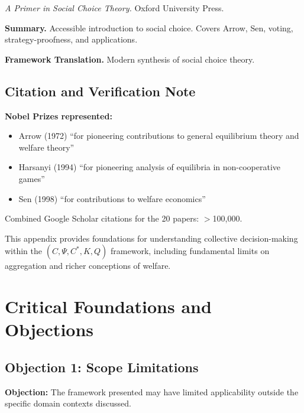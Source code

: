 \textit{A Primer in Social Choice Theory.}
Oxford University Press.

\textbf{Summary.}
Accessible introduction to social choice. Covers Arrow, Sen, voting, 
strategy-proofness, and applications.

\textbf{Framework Translation.}
Modern synthesis of social choice theory.

\subsection{Citation and Verification Note}

\textbf{Nobel Prizes represented:}
\begin{itemize}
    \item Arrow (1972) ``for pioneering contributions to general equilibrium theory and welfare theory''
    \item Harsanyi (1994) ``for pioneering analysis of equilibria in non-cooperative games''
    \item Sen (1998) ``for contributions to welfare economics''
\end{itemize}

Combined Google Scholar citations for the 20 papers: $>$100,000.

This appendix provides foundations for understanding collective decision-making 
within the $(C, \Psi, C^*, K, Q)$ framework, including fundamental limits on 
aggregation and richer conceptions of welfare.




\section{Critical Foundations and Objections}
\label{sec:cho-foundations}

\subsection{Objection 1: Scope Limitations}

\textbf{Objection:} The framework presented may have limited applicability
outside the specific domain contexts discussed.

